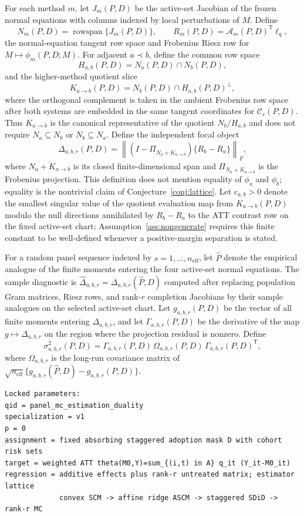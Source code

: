 \documentclass[11pt]{article}
\newcommand{\transpose}{\mathsf{T}}
\theoremstyle{definition}
\theoremstyle{plain}
\theoremstyle{remark}
\begin{document}
For each method $m$, let $J_m(P,D)$ be the active-set Jacobian of the frozen
normal equations with columns indexed by local perturbations of $M$. Define
\[
  N_m(P,D)=\operatorname{rowspan}\{J_m(P,D)\},\qquad
  R_m(P,D)=\mathcal A_m(P,D)^\transpose \ell_q,
\]
the normal-equation tangent row space and Frobenius Riesz row for
$M\mapsto\phi_m(P,D;M)$. For adjacent $a\prec b$, define
the common row space
\[
  H_{a,b}(P,D)=N_a(P,D)\cap N_b(P,D),
\]
and the higher-method quotient slice
\[
  K_{a\to b}(P,D)=N_b(P,D)\cap H_{a,b}(P,D)^\perp,
\]
where the orthogonal complement is taken in the ambient Frobenius row space
after both systems are embedded in the same tangent coordinates for
$\mathcal C_r(P,D)$. Thus $K_{a\to b}$ is the canonical representative of
the quotient $N_b/H_{a,b}$ and does not require $N_a\subseteq N_b$ or
$N_b\subseteq N_a$. Define the independent
focal object
\[
  \Delta_{a,b,r}(P,D)=
  \left\|(I-\Pi_{\overline{N_a+K_{a\to b}}})\{R_b-R_a\}\right\|_F,
\]
where $\overline{N_a+K_{a\to b}}$ is its closed finite-dimensional
span and $\Pi_{\overline{N_a+K_{a\to b}}}$ is the Frobenius projection. This
definition does not mention equality of $\phi_a$ and $\phi_b$; equality is the
nontrivial claim of Conjecture~\ref{conj:lattice}. Let $c_{a,b}>0$ denote the
smallest singular value of the quotient evaluation map from
$K_{a\to b}(P,D)$ modulo the null directions annihilated by $R_b-R_a$ to the
ATT contrast row on the fixed active-set chart; Assumption~\ref{ass:nongenerate}
requires this finite constant to be well-defined whenever a positive-margin
separation is stated.

For a random panel sequence indexed by $s=1,\ldots,n_{\mathrm{eff}}$, let
$\widehat P$ denote the empirical analogue of the finite moments entering the
four active-set normal equations. The sample diagnostic is
$\widehat\Delta_{a,b,r}=\Delta_{a,b,r}(\widehat P,D)$ computed after replacing
population Gram matrices, Riesz rows, and rank-$r$ completion Jacobians by
their sample analogues on the selected active-set chart. Let
$g_{a,b,r}(P,D)$ be the vector of all finite moments entering
$\Delta_{a,b,r}$, and let $\Gamma_{a,b,r}(P,D)$ be the derivative of the map
$g\mapsto\Delta_{a,b,r}$ on the region where the projection residual is
nonzero. Define
\[
  \sigma^2_{a,b,r}(P,D)=
  \Gamma_{a,b,r}(P,D)\,\Omega_{a,b,r}(P,D)\,
  \Gamma_{a,b,r}(P,D)^\transpose,
\]
where $\Omega_{a,b,r}$ is the long-run covariance matrix of
$\sqrt{n_{\mathrm{eff}}}\{g_{a,b,r}(\widehat P,D)-g_{a,b,r}(P,D)\}$.

\begin{verbatim}
Locked parameters:
qid = panel_mc_estimation_duality
specialization = v1
p = 0
assignment = fixed absorbing staggered adoption mask D with cohort risk sets
target = weighted ATT theta(M0,Y)=sum_{(i,t) in A} q_it (Y_it-M0_it)
regression = additive effects plus rank-r untreated matrix; estimator lattice
             convex SCM -> affine ridge ASCM -> staggered SDiD -> rank-r MC
\end{verbatim}
\end{document}
